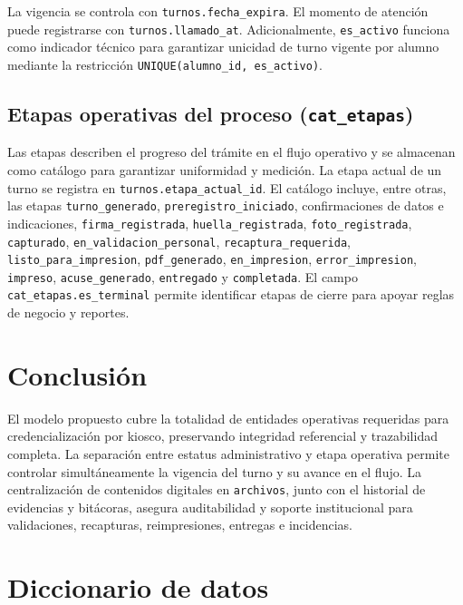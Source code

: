 \documentclass[12pt,a4paper]{article}
\begin{document}
La vigencia se controla con \texttt{turnos.fecha\_expira}. El momento de atención puede registrarse con \texttt{turnos.llamado\_at}. Adicionalmente, \texttt{es\_activo} funciona como indicador técnico para garantizar unicidad de turno vigente por alumno mediante la restricción \texttt{UNIQUE(alumno\_id, es\_activo)}.

\subsection{Etapas operativas del proceso (\texttt{cat\_etapas})}

Las etapas describen el progreso del trámite en el flujo operativo y se almacenan como catálogo para garantizar uniformidad y medición. La etapa actual de un turno se registra en \texttt{turnos.etapa\_actual\_id}. El catálogo incluye, entre otras, las etapas \texttt{turno\_generado}, \texttt{preregistro\_iniciado}, confirmaciones de datos e indicaciones, \texttt{firma\_registrada}, \texttt{huella\_registrada}, \texttt{foto\_registrada}, \texttt{capturado}, \texttt{en\_validacion\_personal}, \texttt{recaptura\_requerida}, \texttt{listo\_para\_impresion}, \texttt{pdf\_generado}, \texttt{en\_impresion}, \texttt{error\_impresion}, \texttt{impreso}, \texttt{acuse\_generado}, \texttt{entregado} y \texttt{completada}. El campo \texttt{cat\_etapas.es\_terminal} permite identificar etapas de cierre para apoyar reglas de negocio y reportes.

\section{Conclusión}

El modelo propuesto cubre la totalidad de entidades operativas requeridas para credencialización por kiosco, preservando integridad referencial y trazabilidad completa. La separación entre estatus administrativo y etapa operativa permite controlar simultáneamente la vigencia del turno y su avance en el flujo. La centralización de contenidos digitales en \texttt{archivos}, junto con el historial de evidencias y bitácoras, asegura auditabilidad y soporte institucional para validaciones, recapturas, reimpresiones, entregas e incidencias.


\clearpage
\section{Diccionario de datos}
\end{document}
